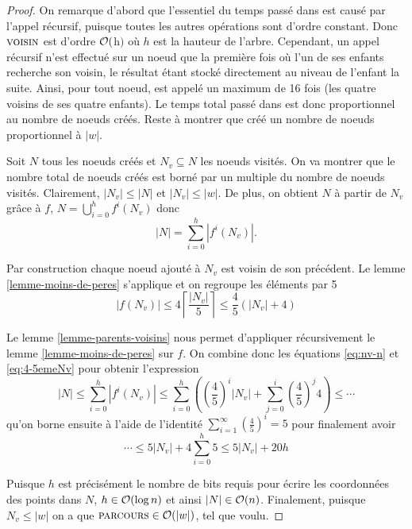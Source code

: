 \begin{proof}
On remarque d'abord que l'essentiel du temps passé dans \voisin est causé par l'appel récursif, puisque toutes les autres opérations sont d'ordre constant. Donc $\text{\scshape voisin}$ est d'ordre $\mathcal{O}($h$)$ où $h$ est la hauteur de l'arbre. Cependant, un appel récursif n'est effectué sur un noeud que la première fois où l'un de ses enfants recherche son voisin, le résultat étant stocké directement au niveau de l'enfant la suite. Ainsi, pour tout noeud, \voisin est appelé un maximum de 16 fois (les quatre voisins de ses quatre enfants). Le temps total passé dans \voisin est donc proportionnel au nombre de noeuds créés. Reste à montrer que \parcours créé un nombre de noeuds proportionnel à $|w|$.

Soit $N$ tous les noeuds créés et $N_v \subseteq N$ les noeuds visités. On va montrer que le nombre total de noeuds créés est borné par un multiple du nombre de noeuds visités. Clairement, $|N_v| ≤ |N|$ et $|N_v| ≤ |w|$. De plus, on obtient $N$ à partir de $N_v$ grâce à $f$, $N = \bigcup_{i=0}^{h}f^i(N_v)$ donc
\begin{equation}\label{eq:nv-n}
|N| = \sum_{i=0}^{h} \left| f^i(N_v) \right|\text{.}
\end{equation}

Par construction chaque noeud ajouté à $N_v$ est voisin de son précédent. Le lemme \ref{lemme-moins-de-peres} s'applique et on regroupe les éléments par 5
\begin{equation}\label{eq:4-5emeNv}
|f(N_v)| ≤ 4 \left \lceil \frac{|N_v|}{5} \right \rceil ≤ \frac{4}{5}(|N_v| + 4)
\end{equation}

Le lemme \ref{lemme-parents-voisins} nous permet d'appliquer récursivement le lemme \ref{lemme-moins-de-peres} sur $f$. On combine donc les équations \ref{eq:nv-n} et \ref{eq:4-5emeNv} pour obtenir l'expression
\begin{equation}
|N| ≤ \sum_{i=0}^{h} \left| f^i(N_v) \right| ≤ \sum_{i=0}^{h} \left( \left( \frac{4}{5} \right)^i |N_v| + \sum_{j=0}^{i} \left( \frac{4}{5} \right)^j 4 \right) ≤ \cdots
\end{equation}
qu'on borne ensuite à l'aide de l'identité $\sum_{i=1}^\infty \left(\frac{4}{5}\right)^i=5$ pour finalement avoir
\begin{equation}
\cdots ≤ 5|N_v| + 4 \sum_{i=0}^{h} 5 ≤ 5|N_v| + 20h
\end{equation}

Puisque $h$ est précisément le nombre de bits requis pour écrire les coordonnées des points dans $N$, $h\in \mathcal{O}(\log n)$ et ainsi $|N| \in \mathcal{O}(n)$. Finalement, puisque $N_v ≤ |w|$ on a que $\text{\scshape parcours} \in \mathcal{O}(|w|)$, tel que voulu.
\end{proof}

